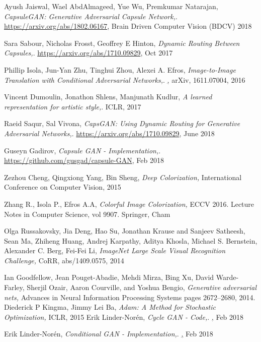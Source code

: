 \documentclass{article} %
\begin{document}
\begin{thebibliography}{999}
Ayush Jaiswal, Wael AbdAlmageed, Yue Wu, Premkumar Natarajan,
\textit{CapsuleGAN: Generative Adversarial Capsule Network,}. 
\href{https://arxiv.org/abs/1802.06167}{https://arxiv.org/abs/1802.06167},
 Brain Driven Computer Vision (BDCV) 2018

Sara Sabour, Nicholas Frosst, Geoffrey E Hinton,  
\textit{Dynamic Routing Between Capsules,}. 
\href{https://arxiv.org/abs/1710.09829}{https://arxiv.org/abs/1710.09829},
Oct 2017

Phillip Isola, Jun-Yan Zhu, Tinghui Zhou, Alexei A. Efros,  
\textit{Image-to-Image Translation with Conditional Adversarial Networks,}. 
\href{https://arxiv.org/pdf/1611.07004.pdf}, arXiv, 1611.07004,
2016

Vincent Dumoulin, Jonathon Shlens, Manjunath Kudlur,  
\textit{A learned representation for artistic style,}. 
ICLR, 2017

Raeid Saqur, Sal Vivona,  
\textit{CapsGAN: Using Dynamic Routing for Generative Adversarial Networks,}. 
\href{https://arxiv.org/abs/1710.09829}{https://arxiv.org/abs/1710.09829},
June 2018

Guseyn Gadirov,  
\textit{Capsule GAN - Implementation,}. 
\href{https://github.com/gusgad/capsule-GAN}{https://github.com/gusgad/capsule-GAN},
Feb 2018

Zezhou Cheng, Qingxiong Yang, Bin Sheng,
\textit{Deep Colorization,} 
International Conference on Computer Vision, 2015 

Zhang R., Isola P., Efros A.A, 
\textit{Colorful Image Colorization,} 
ECCV 2016. Lecture Notes in Computer Science, vol 9907. Springer, Cham

Olga Russakovsky, Jia Deng, Hao Su, Jonathan Krause and
               Sanjeev Satheesh, Sean Ma, Zhiheng Huang, Andrej Karpathy, Aditya Khosla, Michael S. Bernstein, Alexander C. Berg, Fei{-}Fei Li, 
\textit{ImageNet Large Scale Visual Recognition Challenge,} 
CoRR, abs/1409.0575, 2014

Ian Goodfellow, Jean Pouget-Abadie, Mehdi Mirza, Bing Xu, David Warde-Farley, Sherjil Ozair, Aaron Courville, and Yoshua Bengio,
\textit{Generative adversarial nets,} 
Advances in Neural Information Processing Systems pages 2672–2680, 2014.
Diederick P Kingma, Jimmy Lei Ba,
\textit{Adam: A Method for Stochastic Optimization,} 
ICLR, 2015
Erik Linder-Norén,  
\textit{Cycle GAN - Code,}. 
\href{https://github.com/eriklindernoren/Keras-GAN/tree/master/cyclegan},
Feb 2018

Erik Linder-Norén,  
\textit{Conditional GAN - Implementation,}. 
\href{https://github.com/eriklindernoren/Keras-GAN/tree/master/pix2pix},
Feb 2018

\end{thebibliography}
\end{document}
